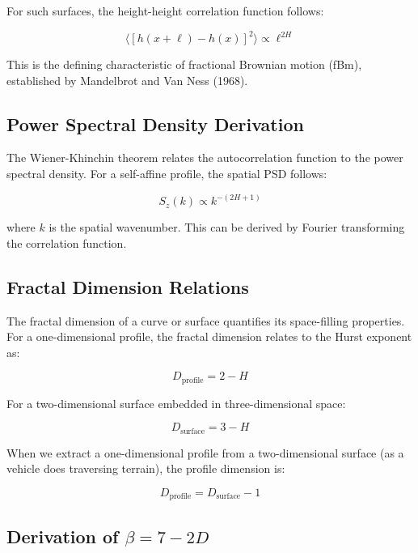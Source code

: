 \documentclass[11pt]{article}
\begin{document}
For such surfaces, the height-height correlation function follows:

\begin{equation}
\langle [h(x+\ell) - h(x)]^2 \rangle \propto \ell^{2H}
\end{equation}

This is the defining characteristic of fractional Brownian motion (fBm), established by Mandelbrot and Van Ness (1968).

\subsection{Power Spectral Density Derivation}

The Wiener-Khinchin theorem relates the autocorrelation function to the power spectral density. For a self-affine profile, the spatial PSD follows:

\begin{equation}
S_z(k) \propto k^{-(2H+1)}
\end{equation}

where $k$ is the spatial wavenumber. This can be derived by Fourier transforming the correlation function.


\subsection{Fractal Dimension Relations}

The fractal dimension of a curve or surface quantifies its space-filling properties. For a one-dimensional profile, the fractal dimension relates to the Hurst exponent as:

\begin{equation}
D_{\text{profile}} = 2 - H
\end{equation}

For a two-dimensional surface embedded in three-dimensional space:

\begin{equation}
D_{\text{surface}} = 3 - H
\end{equation}

When we extract a one-dimensional profile from a two-dimensional surface (as a vehicle does traversing terrain), the profile dimension is:

\begin{equation}
D_{\text{profile}} = D_{\text{surface}} - 1
\end{equation}

\subsection{Derivation of $\beta = 7-2D$}
\end{document}
